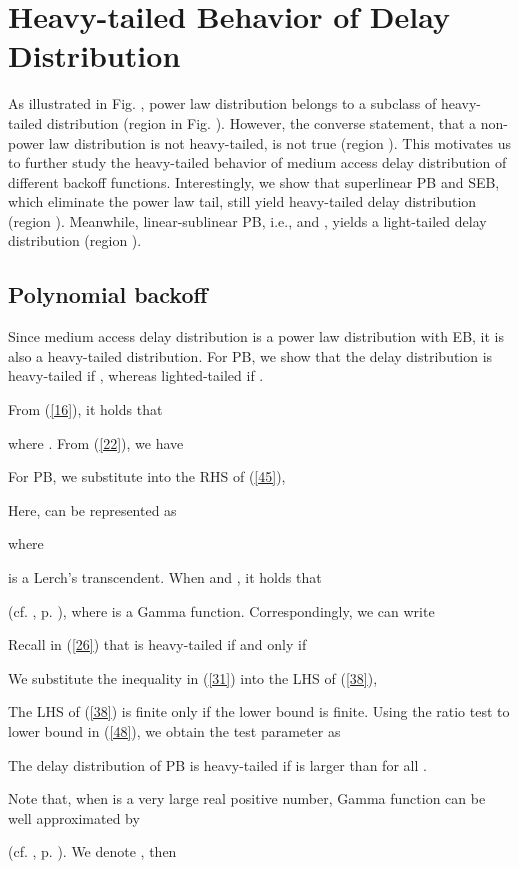 \documentclass[journal]{IEEEtran}
\begin{document}
\section{Heavy-tailed Behavior of Delay Distribution}
As illustrated in Fig. , power law distribution belongs to a subclass of heavy-tailed distribution (region  in Fig. ). However, the converse statement, that a non-power law distribution is not heavy-tailed, is not true (region ). This motivates us to further study the heavy-tailed behavior of medium access delay distribution of different backoff functions. Interestingly, we show that superlinear PB and SEB, which eliminate the power law tail, still yield heavy-tailed delay distribution (region ). Meanwhile, linear-sublinear PB, i.e.,  and , yields a light-tailed delay distribution (region ).

\subsection{Polynomial backoff}
Since medium access delay distribution is a power law distribution with EB, it is also a heavy-tailed distribution. For PB, we show that the delay distribution is heavy-tailed if , whereas lighted-tailed if .

From (\ref{16}), it holds that

where . From (\ref{22}), we have

For PB, we substitute  into the RHS of (\ref{45}),

Here,  can be represented as

where

is a Lerch's transcendent. When  and , it holds that

(cf. \cite{1953:Bateman}, p. ), where  is a Gamma function. Correspondingly, we can write


Recall in (\ref{26}) that  is heavy-tailed if and only if

We substitute the inequality in (\ref{31}) into the LHS of (\ref{38}),

The LHS of (\ref{38}) is finite only if the lower bound is finite. Using the ratio test to lower bound in (\ref{48}), we obtain the test parameter as

The delay distribution of PB is heavy-tailed if  is larger than  for all .

Note that, when  is a very large real positive number, Gamma function can be well approximated by

(cf. \cite{1953:Bateman}, p. ). We denote , then
\end{document}
